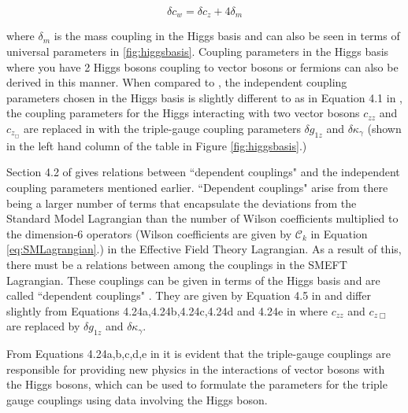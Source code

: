 \documentclass[11pt,oneside,a4paper]{article}
\begin{document}
\begin{equation}
\label{eq:couplingequation}
\delta c_{w} = \delta c_{z} + 4 \delta_{m}
\end{equation}

where $\delta_{m}$ is the mass coupling in the Higgs basis and can also be seen in terms of universal parameters in \ref{fig:higgsbasis}. Coupling parameters in the Higgs basis where you have 2 Higgs bosons coupling to vector bosons or fermions can also be  derived in this manner. When compared to \cite{higgsbasis}, the independent coupling parameters chosen in the Higgs basis is slightly different to \cite{universal} as in Equation 4.1 in \cite{higgsbasis}, the coupling parameters for the Higgs interacting with two vector bosons $c_{zz}$ and $c_{z_\Box}$ are replaced in \cite{universal} with the triple-gauge coupling parameters $\delta g_{1z}$ and $\delta \kappa_{\gamma}$ (shown in the left hand column of the table in Figure \ref{fig:higgsbasis}.)

Section 4.2  of \cite{higgsbasis} gives relations between ``dependent couplings" and the independent coupling parameters mentioned earlier. ``Dependent couplings" arise from there being a larger number of terms that encapsulate the deviations from the Standard Model Lagrangian than the number of Wilson coefficients multiplied to the dimension-6 operators (Wilson coefficients are given by $\mathcal{C}_{k}$ in Equation \ref{eq:SMLagrangian}.) in the Effective Field Theory Lagrangian. As a result of this, there must be a relations between among the couplings in the SMEFT Lagrangian. These couplings can be given in terms of the Higgs basis and are called ``dependent couplings" \cite{higgsbasis}. They are given by Equation 4.5 in \cite{higgsbasis} and differ slightly from Equations 4.24a,4.24b,4.24c,4.24d and 4.24e in \cite{universal} where $c_{zz}$ and $c_{z \Box}$ are replaced by $\delta g_{1z}$ and $\delta \kappa_{\gamma}$. 

From Equations 4.24a,b,c,d,e in \cite{universal} it is evident that the triple-gauge couplings are responsible for providing new physics in the interactions of vector bosons with the Higgs bosons, which can be used to formulate the parameters for the triple gauge couplings using data involving the Higgs boson. 
\end{document}
